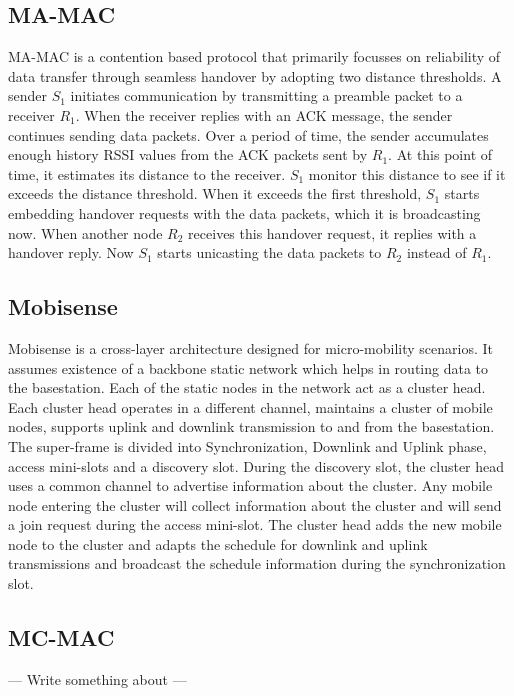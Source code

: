 \documentclass[a4paper, conference, 10pt]{IEEEtran}
\begin{document}
\subsection{MA-MAC}
MA-MAC \cite{ma-mac} is a contention based protocol that primarily focusses on reliability of data transfer through seamless handover by adopting two distance thresholds. A sender \emph{$S_1$} initiates communication by transmitting a preamble packet to a receiver \emph{$R_1$}. When the receiver replies with an ACK message, the sender continues sending data packets. Over a period of time, the sender accumulates enough history RSSI values from the ACK packets sent by \emph{$R_1$}. At this point of time, it estimates its distance to the receiver. \emph{$S_1$} monitor this distance to see if it exceeds the distance threshold. When it exceeds the first threshold, \emph{$S_1$} starts embedding handover requests with the data packets, which it is broadcasting now. When another node \emph{$R_2$} receives this handover request, it replies with a handover reply. Now \emph{$S_1$} starts unicasting the data packets to \emph{$R_2$} instead of \emph{$R_1$}.  
 
\subsection{Mobisense}
Mobisense \cite{mobisense} is a cross-layer architecture designed for micro-mobility scenarios. It assumes existence of a backbone static network which helps in routing data to the basestation. Each of the static nodes in the network act as a cluster head. Each cluster head operates in a different channel, maintains a cluster of mobile nodes, supports uplink and downlink transmission to and from the basestation. The super-frame is divided into Synchronization, Downlink and Uplink phase, access mini-slots and a discovery slot. During the discovery slot, the cluster head uses a common channel to  advertise information about the cluster. Any mobile node entering the cluster will collect information about the cluster and will send a join request during the access mini-slot. The cluster head adds the new mobile node to the cluster and adapts the schedule for downlink and uplink transmissions and broadcast the schedule information during the synchronization slot.  

\subsection{MC-MAC}
--- Write something about \cite{mc-mac} ---\\ \\
\end{document}
